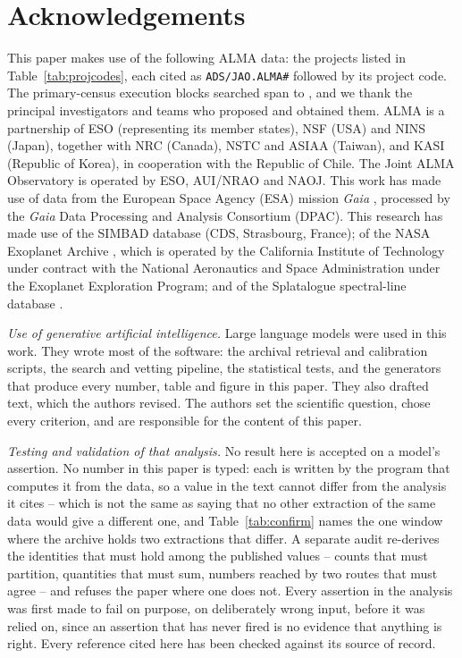 \section*{Acknowledgements}
This paper makes use of the following ALMA data: the \NProjCodes{} projects
listed in Table~\ref{tab:projcodes}, each cited as \texttt{ADS/JAO.ALMA\#}
followed by its project code. The \NEB{} primary-census execution blocks
searched span \PrEbDateFirst{} to \PrEbDateLast{}, and we thank the principal
investigators and teams who proposed and obtained
them.\ProjCodeUnresClause{} ALMA is a partnership of ESO
(representing its member states), NSF (USA) and NINS (Japan), together with NRC
(Canada), NSTC and ASIAA (Taiwan), and KASI (Republic of Korea), in cooperation
with the Republic of Chile. The Joint ALMA Observatory is operated by ESO,
AUI/NRAO and NAOJ. This work has made use of data from the European Space
Agency (ESA) mission {\it Gaia} \citep{GaiaDR3}, processed by the {\it Gaia}
Data Processing and Analysis Consortium (DPAC). This research has made use
of the SIMBAD database \citep{SIMBAD2000} (CDS, Strasbourg, France); of the
NASA Exoplanet Archive \citep{NEA2013}, which is operated by the California
Institute of Technology under contract with the National Aeronautics and
Space Administration under the Exoplanet Exploration Program; and of the
Splatalogue spectral-line database \citep{Splatalogue2007}.

\emph{Use of generative artificial intelligence.} Large language models were
used in this work. They wrote most of the software: the archival retrieval and
calibration scripts, the search and vetting pipeline, the statistical tests,
and the generators that produce every number, table and figure in this paper.
They also drafted text, which the authors revised. The authors set the
scientific question, chose every criterion, and are responsible for the
content of this paper.

\emph{Testing and validation of that analysis.} No result here is accepted
on a model's assertion. No number in this paper is typed: each is written by
the program that computes it from the data, so a value in the text cannot
differ from the analysis it cites -- which is not the same as saying that no
other extraction of the same data would give a different one, and
Table~\ref{tab:confirm} names the one window where the archive holds two
extractions that differ. A separate audit re-derives the
identities that must hold among the published values -- counts that must
partition, quantities that must sum, numbers reached by two routes that must
agree -- and refuses the paper where one does not. Every assertion in the
analysis was first made to fail on purpose, on deliberately wrong input,
before it was relied on, since an assertion that has never fired is no
evidence that anything is right. Every reference cited here has been checked
against its source of record.


